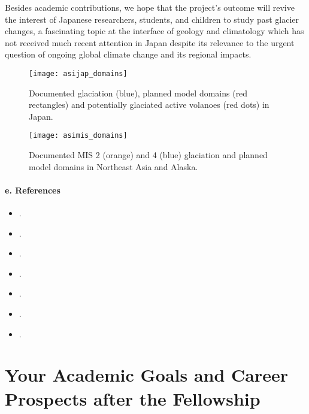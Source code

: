 \documentclass{article}
\begin{document}
    Besides academic contributions, we hope that the project's outcome will
    revive the interest of Japanese researchers, students, and children to
    study past glacier changes, a fascinating topic at the interface of geology
    and climatology which has not received much recent attention in Japan
    despite its relevance to the urgent question of ongoing global climate
    change and its regional impacts.

    \begin{figure}[p]
      \centerline{\texttt{[image: asijap\_domains]}}
      \caption{%
        Documented glaciation (blue), planned model domains (red rectangles)
        and potentially glaciated active volanoes (red dots) in Japan.}
      \label{fig:japan}
    \end{figure}

    \begin{figure}[p]
      \centerline{\texttt{[image: asimis\_domains]}}
      \caption{%
        Documented MIS 2 (orange) and 4 (blue) glaciation and planned model
        domains in Northeast Asia and Alaska.}
      \label{fig:asia}
    \end{figure}

\paragraph{e. References}

    \begin{itemize}
      \item{}.
      \item{}.
      \item{}.
      \item{}.
      \item{}.
      \item{}.
      \item{}.
    \end{itemize}


\section{Your Academic Goals and Career Prospects after the Fellowship}
\end{document}
